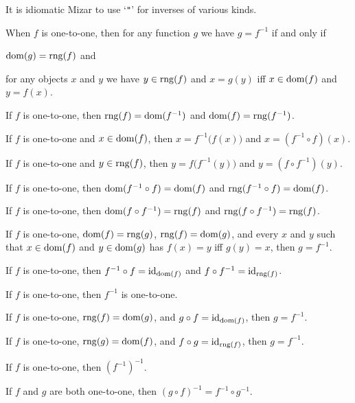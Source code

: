 \documentclass{article}
\begin{document}
\begin{remark}
It is idiomatic Mizar to use `\verb#"#' for inverses of various kinds.
\end{remark}

\begin{thm}
\item\label{funct1:32} When $f$ is one-to-one,
  then for any function $g$ we have $g=f^{-1}$ if and only if
  \begin{enumerate*}[label=(\roman*)]
  \item $\operatorname{dom}(g)=\operatorname{rng}(f)$ and
  \item for any objects $x$ and $y$ we have
  $y\in\operatorname{rng}(f)$ and $x=g(y)$ iff $x\in\operatorname{dom}(f)$ and $y=f(x)$.
  \end{enumerate*}
\item\label{funct1:33} If $f$ is one-to-one, then $\operatorname{rng}(f)=\operatorname{dom}(f^{-1})$
  and $\operatorname{dom}(f)=\operatorname{rng}(f^{-1})$.
\item\label{funct1:34} If $f$ is one-to-one and $x\in\operatorname{dom}(f)$,
  then $x=f^{-1}\bigl(f(x)\bigr)$ and $x=(f^{-1}\circ f)(x)$.
\item\label{funct1:35} If $f$ is one-to-one and $y\in\operatorname{rng}(f)$,
  then $y=f\bigl(f^{-1}(y)\bigr)$ and $y=(f\circ f^{-1})(y)$.
\item\label{funct1:36} If $f$ is one-to-one, then $\operatorname{dom}(f^{-1}\circ f)=\operatorname{dom}(f)$
  and $\operatorname{rng}(f^{-1}\circ f)=\operatorname{dom}(f)$.
\item\label{funct1:37} If $f$ is one-to-one, then $\operatorname{dom}(f\circ f^{-1})=\operatorname{rng}(f)$
  and $\operatorname{rng}(f\circ f^{-1})=\operatorname{rng}(f)$.
\item\label{funct1:38} If $f$ is one-to-one, $\operatorname{dom}(f)=\operatorname{rng}(g)$,
  $\operatorname{rng}(f)=\operatorname{dom}(g)$, and every $x$ and $y$ such that $x\in\operatorname{dom}(f)$ and
  $y\in\operatorname{dom}(g)$ has $f(x)=y$ iff $g(y)=x$, then $g=f^{-1}$.
\item\label{funct1:39} If $f$ is one-to-one, then $f^{-1}\circ f=\operatorname{id}_{\operatorname{dom}(f)}$
  and $f\circ f^{-1}=\operatorname{id}_{\operatorname{rng}(f)}$.
\item\label{funct1:40} If $f$ is one-to-one, then $f^{-1}$ is one-to-one.
\item\label{funct1:41} If $f$ is one-to-one, $\operatorname{rng}(f)=\operatorname{dom}(g)$, and
  $g\circ f=\operatorname{id}_{\operatorname{dom}(f)}$, then $g=f^{-1}$.
\item\label{funct1:42} If $f$ is one-to-one, $\operatorname{rng}(g)=\operatorname{dom}(f)$, and
  $f\circ g=\operatorname{id}_{\operatorname{rng}(f)}$, then $g=f^{-1}$.
\item\label{funct1:43} If $f$ is one-to-one, then $(f^{-1})^{-1}$.
\item\label{funct1:44} If $f$ and $g$ are both one-to-one, then $(g\circ f)^{-1}=f^{-1}\circ g^{-1}$.

\end{thm}
\end{document}
